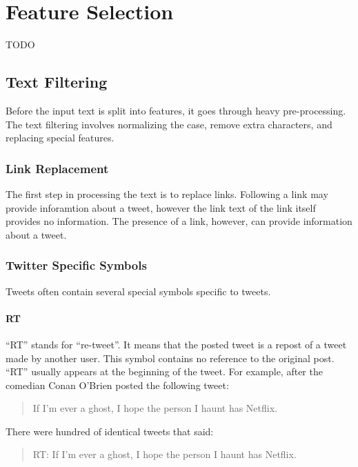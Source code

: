 \documentclass[12pt]{ucthesis}
\begin{document}
\section{Feature Selection}
\label{class-features}
TODO

\subsection{Text Filtering}
\label{class-filter}
Before the input text is split into features, it goes through heavy pre-processing.
The text filtering involves normalizing the case, remove extra characters, and replacing special features.

\subsubsection{Link Replacement}
\label{class-filter-link-replacement}
The first step in processing the text is to replace links.
Following a link may provide inforamtion about a tweet, however the link text of the link
itself provides no information. The presence of a link, however, can provide information about
a tweet.

\subsubsection{Twitter Specific Symbols}
\label{class-filter-twitter-symbols}
Tweets often contain several special symbols specific to tweets.

\paragraph{RT}
\label{class-twitter-symbols-rt}
``RT'' stands for ``re-tweet''. It means that the posted tweet is a repost of
a tweet made by another user. This symbol contains no reference to the original post.
``RT'' usually appears at the beginning of the tweet. For example, after the comedian
Conan O'Brien posted the following tweet:

\begin{quote}
If I'm ever a ghost, I hope the person I haunt has Netflix.
\end{quote}

There were hundred of identical tweets that said:

\begin{quote}
RT: If I'm ever a ghost, I hope the person I haunt has Netflix.
\end{quote}
\end{document}
